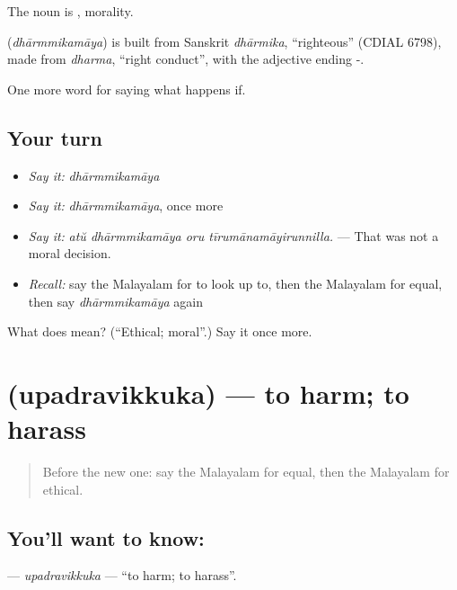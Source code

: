 The noun is , morality.

\begin{cousinweb}
\textbf{} (\emph{dhārmmikamāya}) is built from Sanskrit \emph{dhārmika}, \textquotedblleft{}righteous\textquotedblright{} (CDIAL 6798), made from \emph{dharma}, \textquotedblleft{}right conduct\textquotedblright{}, with the adjective ending -.
\end{cousinweb}

\begin{grammarlens}[title={What you've built}]
One more word for saying what happens if.
\end{grammarlens}

\subsection*{Your turn}
\begin{itemize}
\raggedright
  \item \emph{Say it:} \emph{dhārmmikamāya}
  \item \emph{Say it:} \emph{dhārmmikamāya}, once more
  \item \emph{Say it:} \emph{atŭ dhārmmikamāya oru tīrumānamāyirunnilla.} — That was not a moral decision.
  \item \emph{Recall:} say the Malayalam for to look up to, then the Malayalam for equal, then say \emph{dhārmmikamāya} again
\end{itemize}

\begin{tcolorbox}[breakable,colback=teal!4,colframe=teal!35!black,title={Before you move on}]
What does  mean? (\textquotedblleft{}Ethical; moral\textquotedblright{}.) Say it once more.
\end{tcolorbox}
\section[\texorpdfstring{\ml{ഉപദ്രവിക്കുക} (upadravikkuka)}{ഉപദ്രവിക്കുക (upadravikkuka)}]{ (upadravikkuka) — to harm; to harass}

\label{lesson:ML-C455-upadravikkuka}



\begin{quote}
Before the new one: say the Malayalam for equal, then the Malayalam for ethical.
\end{quote}

\subsection*{You'll want to know: }
\textbf{} — \emph{upadravikkuka} — \textquotedblleft{}to harm; to harass\textquotedblright{}.

